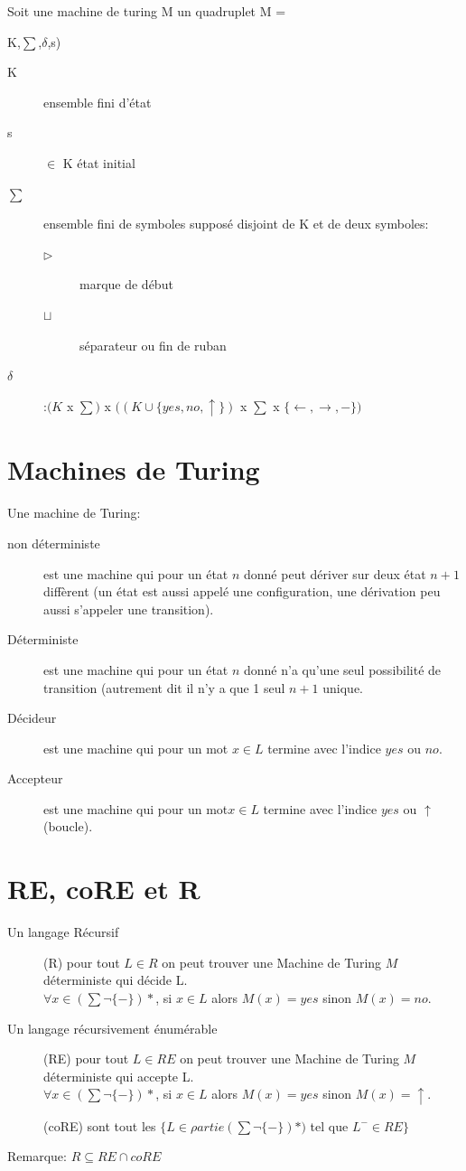 Soit une machine de turing M un quadruplet M = {K,$\sum$,$\delta$,s)
\begin{description}
\item [K] ensemble fini d'état 
\item [s] $\in$ K état initial
\item [$\sum$] ensemble fini de symboles supposé disjoint de K et de deux symboles:
\begin{description}
\item [$\triangleright$] marque de début
\item [$\sqcup$] séparateur ou fin de ruban
\end{description}
\item [$\delta$]:$(K$ x $\sum)$ x $((K\cup\{yes,no,\uparrow \})$ x $\sum $ x $\{\leftarrow,\rightarrow,-\})$
\end{description}
\pagebreak
\section{Machines de Turing}
Une machine de Turing:
\begin{description}
\item[non déterministe] est une machine qui pour un état $n$ donné peut dériver sur deux état $n+1$ diffèrent (un état est aussi appelé une configuration, une dérivation peu aussi s'appeler une transition).
\item[Déterministe] est une machine qui pour un état $n$ donné n'a qu'une seul possibilité de transition (autrement dit il n'y a que 1 seul $n+1$ unique.
\item[Décideur] est une machine qui pour un mot $x \in L$ termine avec l'indice $yes$ ou $no$.
\item[Accepteur] est une machine qui pour un mot$x \in L$ termine avec l'indice $yes$ ou $\uparrow$ (boucle).
\end{description}

\section{RE, coRE et R}
\begin{description}
\item[Un langage Récursif] (R) pour tout $L \in R$ on peut trouver une Machine de Turing $M$ déterministe qui décide L.\\
$\forall x \in (\sum  \neg \{-\})*$, si $x \in L$ alors $M(x)=yes$ sinon $M(x)=no$.
\item[Un langage récursivement énumérable] (RE) pour tout $L \in RE$ on peut trouver une Machine de Turing $M$ déterministe qui accepte L.\\
$\forall x \in (\sum \neg \{-\})*$, si $x \in L$ alors $M(x)=yes$ sinon $M(x)=\uparrow$.
\item[] (coRE) sont tout les $\{ L \in \rho artie(\sum \neg \{-\})*)$ tel que $L^- \in RE \}$
\end{description}
Remarque: $R \subseteq RE \cap coRE$
\pagebreak
}
